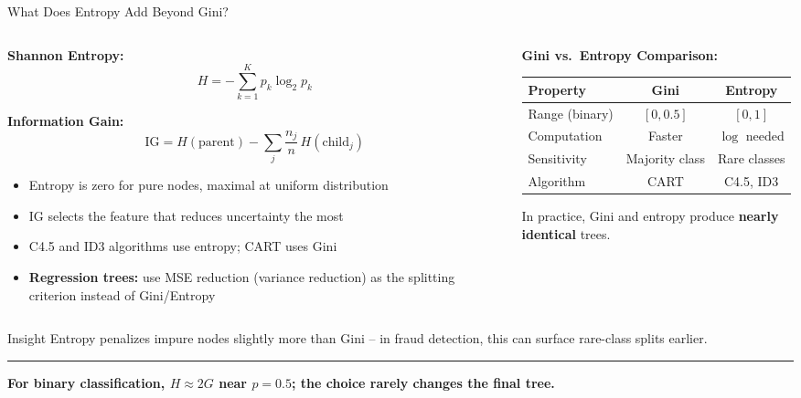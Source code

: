 \documentclass[8pt,aspectratio=169]{beamer}
\newcommand{\bottomnote}[1]{%
\vfill
\vspace{-2mm}
\textcolor{mllavender2}{\rule{\textwidth}{0.4pt}}
\vspace{1mm}
\footnotesize
\textbf{#1}
}
\newenvironment{compactlist}{%
  \begin{itemize}%
    \setlength{\itemsep}{2pt}%
    \setlength{\parskip}{0pt}%
    \setlength{\parsep}{0pt}%
}{%
  \end{itemize}%
}
\newcommand{\highlight}[1]{\textcolor{mlorange}{\textbf{#1}}}
\begin{document}
\begin{frame}{What Does Entropy Add Beyond Gini?}
\begin{columns}[T]
\begin{column}{0.55\textwidth}
\small
\textbf{Shannon Entropy:}
\[
H = -\sum_{k=1}^{K} p_k \log_2 p_k
\]

\vspace{0.3em}
\footnotesize
\textbf{Information Gain:}
\[
\text{IG} = H(\text{parent}) - \sum_{j} \frac{n_j}{n}\,H(\text{child}_j)
\]

\vspace{0.3em}
\begin{compactlist}
\item Entropy is zero for pure nodes, maximal at uniform distribution
\item IG selects the feature that reduces uncertainty the most
\item C4.5 and ID3 algorithms use entropy; CART uses Gini
\item \highlight{Regression trees:} use MSE reduction (variance reduction) as the splitting criterion instead of Gini/Entropy
\end{compactlist}
\end{column}
\begin{column}{0.42\textwidth}
\footnotesize
\textbf{Gini vs.\ Entropy Comparison:}

\vspace{0.3em}
\renewcommand{\arraystretch}{1.2}
\begin{tabular}{@{}lcc@{}}
\toprule
\textbf{Property} & \textbf{Gini} & \textbf{Entropy} \\
\midrule
Range (binary) & $[0, 0.5]$ & $[0, 1]$ \\
Computation & Faster & $\log$ needed \\
Sensitivity & Majority class & Rare classes \\
Algorithm & CART & C4.5, ID3 \\
\bottomrule
\end{tabular}

\vspace{0.5em}
In practice, Gini and entropy produce \highlight{nearly identical} trees.
\end{column}
\end{columns}

\begin{block}{Insight}
\scriptsize Entropy penalizes impure nodes slightly more than Gini -- in fraud detection, this can surface rare-class splits earlier.
\end{block}
\bottomnote{For binary classification, $H \approx 2G$ near $p=0.5$; the choice rarely changes the final tree.}
\end{frame}
\end{document}
